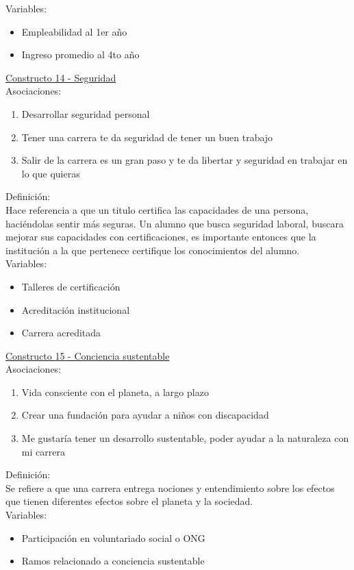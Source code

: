 Variables:
\begin{itemize}
	\item Empleabilidad al 1er año
	\item Ingreso promedio al 4to año	
\end{itemize} 


\underline {Constructo 14 - Seguridad} \\
Asociaciones:
\begin{enumerate}
	\item Desarrollar seguridad personal
	\item Tener una carrera te da seguridad de tener un buen trabajo	
	\item Salir de la carrera es un gran paso y te da libertar y seguridad en trabajar en lo que quieras
\end{enumerate}

Definición:\\
Hace referencia a que un titulo certifica las capacidades de una persona, haciéndolas sentir más seguras. Un alumno que busca seguridad laboral, buscara mejorar sus capacidades con certificaciones, es importante entonces que la institución a la que pertenece certifique los conocimientos del alumno.\\

Variables:
\begin{itemize}
	\item Talleres de certificación
	\item Acreditación institucional
	\item Carrera acreditada	
\end{itemize} 

\underline {Constructo 15 - Conciencia sustentable} \\
Asociaciones:
\begin{enumerate}
	\item Vida consciente con el planeta, a largo plazo
	\item Crear una fundación para ayudar a niños con discapacidad	
	\item Me gustaría tener un desarrollo sustentable, poder ayudar a la naturaleza con mi carrera
\end{enumerate}

Definición:\\
Se refiere a que una carrera entrega nociones y entendimiento sobre los efectos que tienen diferentes efectos sobre el planeta y la sociedad.\\  

Variables:
\begin{itemize}
	\item Participación en voluntariado social o ONG
	\item Ramos relacionado a conciencia sustentable	
\end{itemize} 

